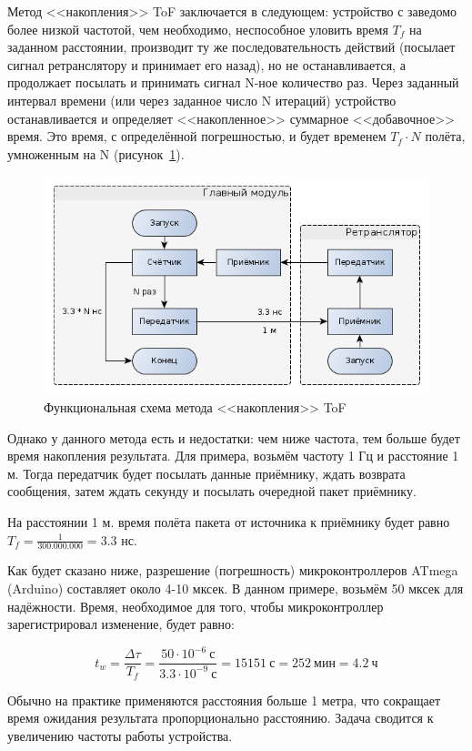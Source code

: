 Метод <<накопления>> ToF заключается в следующем: устройство с заведомо более низкой частотой, чем необходимо, неспособное уловить время $T_f$ на заданном расстоянии, производит ту же последовательность действий (посылает сигнал ретранслятору и принимает его назад), но не останавливается, а продолжает посылать и принимать сигнал N-ное количество раз. Через заданный интервал времени (или через заданное число N итераций) устройство останавливается и определяет <<накопленное>> суммарное <<добавочное>> время. Это время, с определённой погрешностью, и будет временем $T_f \cdot N$ полёта, умноженным на N (рисунок~\ref{fig:accscheme}).

\begin{figure}[ht]
    \includegraphics[width=1\linewidth]{Figures/accscheme.png}
    \caption{Функциональная схема метода <<накопления>> ToF}
    \label{fig:accscheme}
\end{figure}

Однако у данного метода есть и недостатки: чем ниже частота, тем больше будет время накопления результата. Для примера, возьмём частоту 1 Гц и расстояние 1 м. Тогда передатчик будет посылать данные приёмнику, ждать возврата сообщения, затем ждать секунду и посылать очередной пакет приёмнику.

На расстоянии 1 м. время полёта пакета от источника к приёмнику будет равно $T_f = \frac{1}{300.000.000} = 3.3$ нс.

Как будет сказано ниже, разрешение (погрешность) микроконтроллеров ATmega (Arduino) составляет около 4-10 мксек. В данном примере, возьмём 50 мксек для надёжности. Время, необходимое для того, чтобы микроконтроллер зарегистрировал изменение, будет равно:

\begin{equation}
t_w = \frac{\Delta\tau}{T_f} = \frac{50 \cdot 10^{-6}~\textrm{с}}{3.3 \cdot 10^{-9}~\textrm{с}} = 15151~\textrm{с} = 252~\textrm{мин} = 4.2~\textrm{ч}
\end{equation}

Обычно на практике применяются расстояния больше 1 метра, что сокращает время ожидания результата пропорционально расстоянию. Задача сводится к увеличению частоты работы устройства.
